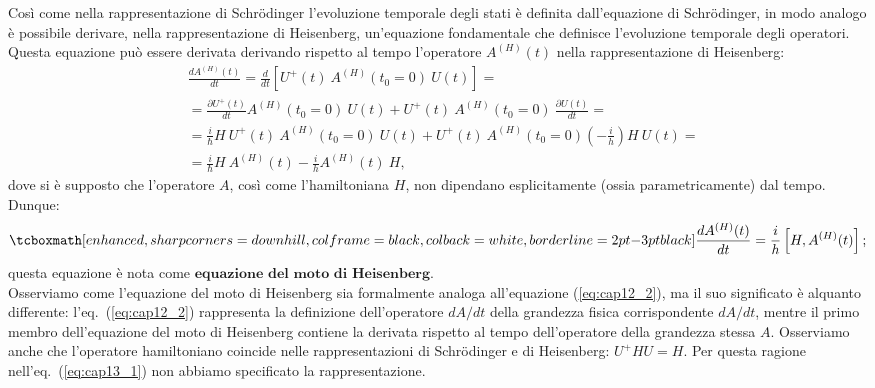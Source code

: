 Così come nella rappresentazione di Schrödinger l'evoluzione temporale degli stati è definita dall'equazione di Schrödinger, in modo analogo è possibile derivare, nella rappresentazione di Heisenberg, un'equazione fondamentale che definisce l'evoluzione temporale degli operatori. Questa equazione può essere derivata derivando rispetto al tempo l'operatore $A^{(H)}(t)$ nella rappresentazione di Heisenberg:
	\begin{align}
		& \frac{dA^{(H)}(t)}{dt} = \frac{d}{dt}\left[U^\textbf{+}(t)\  A^{(H)}(t_0=0)\ U(t)\right] = \nonumber \\
		&= \frac{\partial U^\textbf{+}(t)}{dt} A^{(H)}(t_0=0)\ U(t) + U^\textbf{+}(t)\  A^{(H)}(t_0=0)\ \frac{\partial U(t)}{dt} = \nonumber \\
		&= \frac{i}{\hbar} H\ U^\textbf{+}(t)\ A^{(H)}(t_0=0)\ U(t) + U^\textbf{+}(t)\ A^{(H)}(t_0=0) \left(-\frac{i}{h}\right) H\ U(t) = \nonumber \\
		&= \frac{i}{\hbar} H\ A^{(H)}(t) - \frac{i}{h} A^{(H)}(t)\ H,
	\end{align}
dove si è supposto che l'operatore $A$, così come l'hamiltoniana $H$, non dipendano esplicitamente (ossia parametricamente) dal tempo. Dunque:
	\begin{equation}
	\label{eq:cap13_1}
		\tcboxmath[enhanced, sharp corners=downhill, colframe=black, colback=white, borderline={2pt}{-3pt}{black}]{
			\frac{d A^{(H)}(t)}{dt} = \frac{i}{h} \left[H, A^{(H)}(t) \right];
			}
	\end{equation}
questa equazione è nota come $\textbf{equazione del moto di Heisenberg}$.\\
 
Osserviamo come l'equazione del moto di Heisenberg sia formalmente analoga all'equazione (\ref{eq:cap12_2}), ma il suo significato è alquanto differente: l'eq.~(\ref{eq:cap12_2}) rappresenta la definizione dell'operatore $dA/dt$ della grandezza fisica corrispondente $dA/dt$, mentre il primo membro dell'equazione del moto di Heisenberg contiene la derivata rispetto al tempo dell'operatore della grandezza stessa $A$. Osserviamo anche che l'operatore hamiltoniano coincide nelle rappresentazioni di Schrödinger e di Heisenberg: $U^\textbf{+} H U = H$. Per questa ragione nell'eq.~(\ref{eq:cap13_1}) non abbiamo specificato la rappresentazione.
